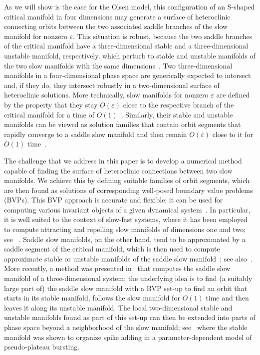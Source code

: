 \documentclass{ws-ijbc}
\begin{document}
As we will show is the case for the Olsen model, this configuration of an S-shaped critical manifold in four dimensions may generate a surface of heteroclinic connecting orbits between the two associated saddle branches of the slow manifold for nonzero $\varepsilon$. This situation is robust, because the two saddle branches of the critical manifold have a three-dimensional stable and a three-dimensional unstable manifold, respectively, which perturb to stable and unstable manifolds of the two slow manifolds with the same dimensions~\cite{Fenichel}. Two three-dimensional manifolds in a four-dimensional phase space are generically expected to intersect and, if they do, they intersect robustly in a two-dimensional surface of heteroclinic solutions. More technically, slow manifolds for nonzero $\varepsilon$ are defined by the property that they stay $O(\varepsilon)$ close to the respective branch of the critical manifold for a time of $O(1)$~\cite{gk-siads09, Saeed_Paper}. Similarly, their stable and unstable manifolds can be viewed as solution families that contain orbit segments that rapidly converge to a saddle slow manifold and then remain $O(\varepsilon)$ close to it for $O(1)$ time~\cite{gk-siads09, Cris_paper, Saeed_Paper}. 

The challenge that we address in this paper is to develop a numerical method capable of finding the surface of heteroclinic connections between two slow manifolds. We achieve this by defining suitable families of orbit segments, which are then found as solutions of corresponding well-posed boundary value problems (BVPs). This BVP approach is accurate and flexible; it can be used for computing various invariant objects of a given dynamical system~\cite{Red_book}. In particular, it is well suited to the context of slow-fast systems, where it has been employed to compute attracting and repelling slow manifolds of dimensions one and two; see ~\cite{MMO,Cris_paper,homotopy_example}. Saddle slow manifolds, on the other hand, tend to be approximated by a saddle segment of the critical manifold, which is then used to compute approximate stable or unstable manifolds of the saddle slow manifold~\cite{QSSA, gk-siads09, Cris_paper}; see also~\cite{Emily_Harvey_paper, nota-jmn}. More recently, a method was presented in~\cite{Saeed_Paper} that computes the saddle slow manifold of a three-dimensional system; the underlying idea is to find (a suitably large part of) the saddle slow manifold with a BVP set-up to find an orbit that starts in its stable manifold, follows the slow manifold for $O(1)$ time and then leaves it along its unstable manifold. The local two-dimensional stable and unstable manifolds found as part of this set-up can then be extended into parts of phase space beyond a neighborhood of the slow manifold; see~\cite{Saeed_Paper} where the stable manifold was shown to organize spike adding in a parameter-dependent model of pseudo-plateau bursting.
\end{document}
